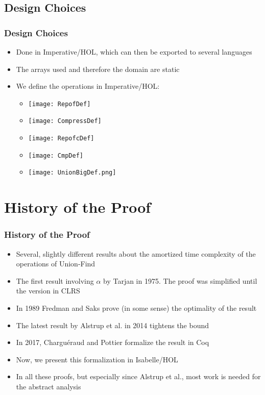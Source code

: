 \subsection{Design Choices}
\begin{frame}
	\frametitle{Design Choices}
	\begin{itemize}
		\item Done in Imperative/HOL, which can then be exported to several languages
		\item The arrays used and therefore the domain are static
		\item We define the operations in Imperative/HOL:
		\begin{itemize}
			\item \texttt{[image: RepofDef]}
			\item \texttt{[image: CompressDef]}
			\item \texttt{[image: RepofcDef]}
			\item \texttt{[image: CmpDef]}
			\item \texttt{[image: UnionBigDef.png]}
		\end{itemize}
	\end{itemize}
\end{frame}

\section{History of the Proof}
\begin{frame}
	\frametitle{History of the Proof}
	\begin{itemize}
		\item Several, slightly different results about the amortized time complexity of the operations of Union-Find
		\item The first result involving $\alpha$ by Tarjan in 1975. The proof was simplified until the version in CLRS
		\item In 1989 Fredman and Saks prove (in some sense) the optimality of the result
		\item The latest result by Alstrup et al. in 2014 tightens the bound
		\item In 2017, Charguéraud and Pottier formalize the result in Coq
		\item Now, we present this formalization in Isabelle/HOL
		\item In all these proofs, but especially since Alstrup et al., most work is needed for the abstract analysis
	\end{itemize}
\end{frame}

